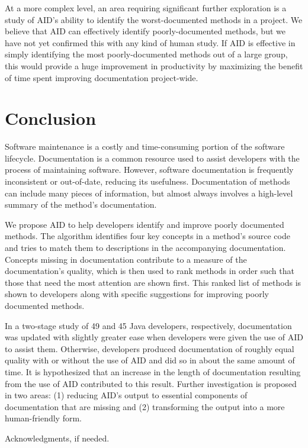 \documentclass[preprint]{sigplanconf}
\begin{document}
At a more complex level, an area requiring significant further exploration is a study of AID's ability to identify the worst-documented methods in a project. We believe that AID can effectively identify poorly-documented methods, but we have not yet confirmed this with any kind of human study. If AID is effective in simply identifying the most poorly-documented methods out of a large group, this would provide a huge improvement in productivity by maximizing the benefit of time spent improving documentation project-wide.

\section{Conclusion}
Software maintenance is a costly and time-consuming portion of the software lifecycle. Documentation is a common resource used to assist developers with the process of maintaining software. However, software documentation is frequently inconsistent or out-of-date, reducing its usefulness. Documentation of methods can include many pieces of information, but almost always involves a high-level summary of the method's documentation.

We propose AID to help developers identify and improve poorly documented methods. The algorithm identifies four key concepts in a method's source code and tries to match them to descriptions in the accompanying documentation. Concepts missing in documentation contribute to a measure of the documentation's quality, which is then used to rank methods in order such that those that need the most attention are shown first. This ranked list of methods is shown to developers along with specific suggestions for improving poorly documented methods.

In a two-stage study of 49 and 45 Java developers, respectively, documentation was updated with slightly greater ease when developers were given the use of AID to assist them. Otherwise, developers produced documentation of roughly equal quality with or without the use of AID and did so in about the same amount of time. It is hypothesized that an increase in the length of documentation resulting from the use of AID contributed to this result. Further investigation is proposed in two areas: (1) reducing AID's output to essential components of documentation that are missing and (2) transforming the output into a more human-friendly form.

\acks

Acknowledgments, if needed.
\end{document}
